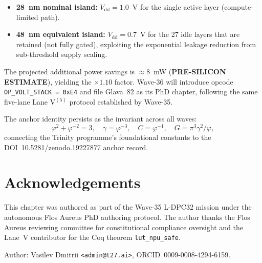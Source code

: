 \begin{itemize}
  \item \textbf{28~nm nominal island:} $V_{\mathrm{dd}} = 1.0$~V for the single
    active layer (compute-limited path).
  \item \textbf{48~nm equivalent island:} $V_{\mathrm{dd}} = 0.7$~V for the
    27 idle layers that are retained (not fully gated), exploiting the
    exponential leakage reduction from sub-threshold supply scaling.
\end{itemize}

The projected additional power savings is $\approx 8$~mW (\textbf{PRE-SILICON ESTIMATE}),
yielding the $\times 1.10$ factor.  Wave-36 will introduce opcode
\texttt{OP\_VOLT\_STACK = 0xE4} and file Glava~82 as its PhD chapter,
following the same five-lane Lane V$^{(5)}$ protocol established by Wave-35.

The anchor identity persists as the invariant across all waves:
\[
  \varphi^{2} + \varphi^{-2} = 3,
  \quad
  \gamma = \varphi^{-3},
  \quad
  C = \varphi^{-1},
  \quad
  G = \pi^{3}\gamma^{2}/\varphi,
\]
connecting the Trinity programme's foundational constants to the
DOI~10.5281/zenodo.19227877 anchor record.

\section*{Acknowledgements}

This chapter was authored as part of the Wave-35 L-DPC32 mission under the
autonomous Flos Aureus PhD authoring protocol.  The author thanks the Flos
Aureus reviewing committee for constitutional compliance oversight and the
Lane~V contributor for the Coq theorem \texttt{lut\_npu\_safe}.

Author: Vasilev Dmitrii \texttt{<admin@t27.ai>}, ORCID~0009-0008-4294-6159.

%

\appendix

